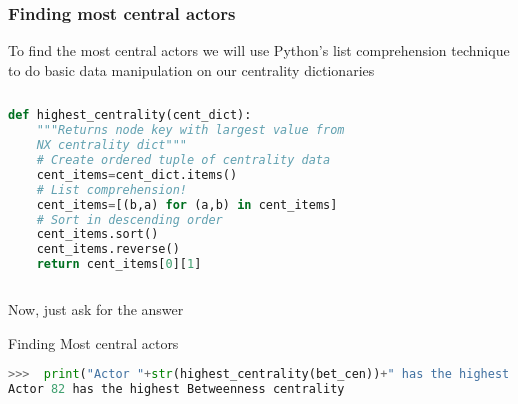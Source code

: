 \documentclass[xcolor=dvipsnames, 9pt]{beamer}
\begin{document}
\begin{frame}[fragile]
    \frametitle{Finding most central actors}
    To find the most central actors we will use Python's \alert{list comprehension} technique to do basic data manipulation on our centrality dictionaries
    \begin{columns}
            \begin{block}{}
        \tiny{\begin{lstlisting}[language=Python]
def highest_centrality(cent_dict):
    """Returns node key with largest value from
    NX centrality dict"""
    # Create ordered tuple of centrality data
    cent_items=cent_dict.items()
    # List comprehension!
    cent_items=[(b,a) for (a,b) in cent_items]
    # Sort in descending order
    cent_items.sort()
    cent_items.reverse()
    return cent_items[0][1]
        \end{lstlisting}}
            \end{block}
    \end{columns}
    \vspace{2mm}Now, just ask for the answer
    \begin{block}{Finding Most central actors}
        \tiny{\begin{lstlisting}[language=Python]
>>>  print("Actor "+str(highest_centrality(bet_cen))+" has the highest Betweenness centrality")
Actor 82 has the highest Betweenness centrality
        \end{lstlisting}}
    \end{block}
\end{frame}
\end{document}
